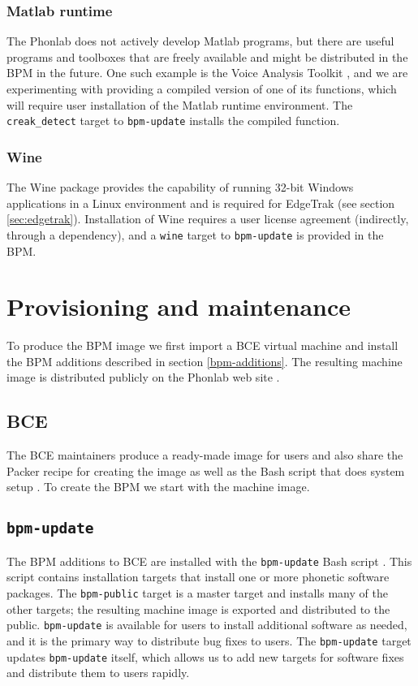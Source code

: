 \documentclass[a4paper]{article}
\begin{document}
      \subsubsection{Matlab runtime}
      The Phonlab does not actively develop Matlab programs, but there are useful programs and toolboxes that are freely available and might be distributed in the BPM in the future. One such example is the Voice Analysis Toolkit \cite{voice-analysis-toolkit}, and we are experimenting with providing a compiled version of one of its functions, which will require user installation of the Matlab runtime environment. The {\tt creak\_detect} target to {\tt bpm-update} installs the compiled function.

      \subsubsection{Wine}
      The Wine package provides the capability of running 32-bit Windows applications in a Linux environment and is required for EdgeTrak (see section \ref{sec:edgetrak}). Installation of Wine requires a user license agreement (indirectly, through a dependency), and a {\tt wine} target to {\tt bpm-update} is provided in the BPM.

  \section{Provisioning and maintenance}
  To produce the BPM image we first import a BCE virtual machine and install the BPM additions described in section \ref{bpm-additions}. The resulting machine image is distributed publicly on the Phonlab web site \cite{bpm-wiki}.

      \subsection{BCE}
      The BCE maintainers produce a ready-made image for users and also share the Packer \cite{packer} recipe for creating the image as well as the Bash script that does system setup \cite{bce-git}. To create the BPM we start with the machine image.

      \subsection{{\tt bpm-update}}\label{bpm-update}
      The BPM additions to BCE are installed with the {\tt bpm-update} Bash script \cite{bpm-update-git}. This script contains installation targets that install one or more phonetic software packages. The {\tt bpm-public} target is a master target and installs many of the other targets; the resulting machine image is exported and distributed to the public. {\tt bpm-update} is available for users to install additional software as needed, and it is the primary way to distribute bug fixes to users. The {\tt bpm-update} target updates {\tt bpm-update} itself, which allows us to add new targets for software fixes and distribute them to users rapidly.
\end{document}

